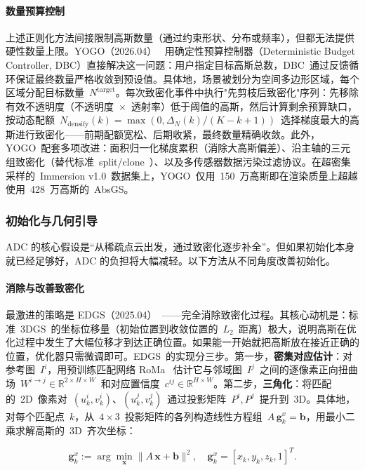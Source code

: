 \paragraph{数量预算控制}

上述正则化方法间接限制高斯数量（通过约束形状、分布或频率），但都无法提供硬性数量上限。YOGO（2026.04）~\cite{2604_21400} 用确定性预算控制器（Deterministic Budget Controller, DBC）直接解决这一问题：用户指定目标高斯总数，DBC~通过反馈循环保证最终数量严格收敛到预设值。具体地，场景被划分为空间多边形区域，每个区域分配目标数量~$N^{\text{target}}$。每次致密化事件中执行"先剪枝后致密化"序列：先移除有效不透明度（不透明度~$\times$~透射率）低于阈值的高斯，然后计算剩余预算缺口，按动态配额~$N_{\text{densify}}(k) = \max(0, \Delta_N(k) / (K{-}k{+}1))$~选择梯度最大的高斯进行致密化——前期配额宽松、后期收紧，最终数量精确收敛。此外，YOGO~配套多项改进：面积归一化梯度累积（消除大高斯偏差）、沿主轴的三元组致密化（替代标准~split/clone~）、以及多传感器数据污染过滤协议。在超密集采样的~Immersion v1.0~数据集上，YOGO~仅用~150~万高斯即在渲染质量上超越使用~428~万高斯的~AbsGS。

\subsubsection{初始化与几何引导}

ADC 的核心假设是“从稀疏点云出发，通过致密化逐步补全”。但如果初始化本身就已经足够好，ADC 的负担将大幅减轻。以下方法从不同角度改善初始化。

\paragraph{消除与改善致密化}

最激进的策略是 EDGS（2025.04）~\cite{2504_13204}——完全消除致密化过程。其核心动机是：标准~3DGS~的坐标位移量（初始位置到收敛位置的~$L_2$~距离）极大，说明高斯在优化过程中发生了大幅位移才到达正确位置。如果能一开始就把高斯放在接近正确的位置，优化器只需微调即可。EDGS~的实现分三步。第一步，\textbf{密集对应估计}：对参考图~$I^i$，用预训练匹配网络 RoMa~\cite{2305_15404} 估计它与邻域图~$I^j$~之间的逐像素正向扭曲场~$W^{i \to j} \in \mathbb{R}^{2 \times H \times W}$~和对应置信度~$c^{ij} \in \mathbb{R}^{H \times W}$。第二步，\textbf{三角化}：将匹配的~2D~像素对~$(u_k^i, v_k^i)$、$(u_k^j, v_k^j)$~通过投影矩阵~$P^i, P^j$~提升到~3D。具体地，对每个匹配点~$k$，从~$4 \times 3$~投影矩阵的各列构造线性方程组~$A\,\mathbf{g}_k^x = \mathbf{b}$，用最小二乘求解高斯的~3D~齐次坐标：

\begin{equation*}
\mathbf{g}_k^x := \arg\min_{\mathbf{x}} \|A\,\mathbf{x} + \mathbf{b}\|^2, \quad \mathbf{g}_k^x = [x_k, y_k, z_k, 1]^T.
\end{equation*}

